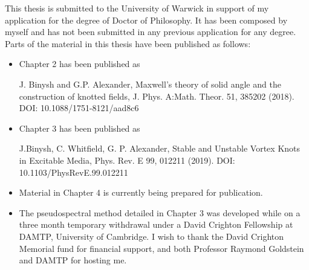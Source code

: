This thesis is submitted to the University of Warwick in support of my application for the degree of Doctor of Philosophy. It has been composed by myself and has not been submitted in any previous application for any degree. Parts of the material in this thesis have been published as follows:
\begin{itemize}
\item Chapter 2 has been published as
    
    J. Binysh and G.P. Alexander, Maxwell’s theory of solid angle and the construction of knotted fields, J. Phys. A:Math. Theor. 51, 385202 (2018). DOI: 10.1088/1751-8121/aad8c6

\item Chapter 3 has been published as
    
    J.Binysh, C. Whitfield, G. P. Alexander, Stable and Unstable Vortex Knots in Excitable Media, Phys. Rev. E 99, 012211 (2019). DOI: 10.1103/PhysRevE.99.012211

\item Material in Chapter 4 is currently being prepared for publication. 

\item The pseudospectral method detailed in Chapter 3 was developed while on a three month temporary withdrawal under a David Crighton Fellowship at DAMTP, University of Cambridge. I wish to thank the David Crighton Memorial fund for financial support, and both Professor Raymond Goldstein and DAMTP for hosting me.
\end{itemize}
 
